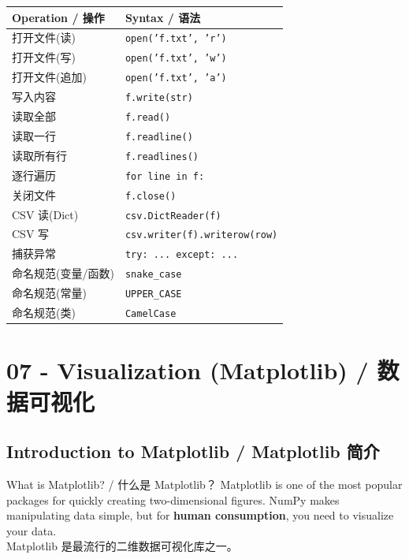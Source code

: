 \documentclass[11pt,a4paper]{report}
\let\oldtexttt\texttt
\renewcommand{\texttt}[1]{\textcolor{mainblue}{\oldtexttt{#1}}}
\begin{document}
\medskip
\centering
\small
\renewcommand{\arraystretch}{1.3}
\begin{tabular}{@{}ll@{}}
\toprule
\textbf{Operation / 操作} & \textbf{Syntax / 语法} \\ \midrule
打开文件(读) & \texttt{open('f.txt', 'r')} \\
打开文件(写) & \texttt{open('f.txt', 'w')} \\
打开文件(追加) & \texttt{open('f.txt', 'a')} \\
写入内容 & \texttt{f.write(str)} \\
读取全部 & \texttt{f.read()} \\
读取一行 & \texttt{f.readline()} \\
读取所有行 & \texttt{f.readlines()} \\
逐行遍历 & \texttt{for line in f:} \\
关闭文件 & \texttt{f.close()} \\
CSV 读(Dict) & \texttt{csv.DictReader(f)} \\
CSV 写 & \texttt{csv.writer(f).writerow(row)} \\
捕获异常 & \texttt{try: ... except: ...} \\
命名规范(变量/函数) & \texttt{snake\_case} \\
命名规范(常量) & \texttt{UPPER\_CASE} \\
命名规范(类) & \texttt{CamelCase} \\ \bottomrule
\end{tabular}
\medskip



\chapter{07 - Visualization (Matplotlib) / 数据可视化}



\section{Introduction to Matplotlib / Matplotlib 简介}

\begin{concept}{What is Matplotlib? / 什么是 Matplotlib？}
    Matplotlib is one of the most popular packages for quickly creating two-dimensional figures. NumPy makes manipulating data simple, but for \textbf{human consumption}, you need to visualize your data. \\
    Matplotlib 是最流行的二维数据可视化库之一。
\end{concept}
\end{document}
